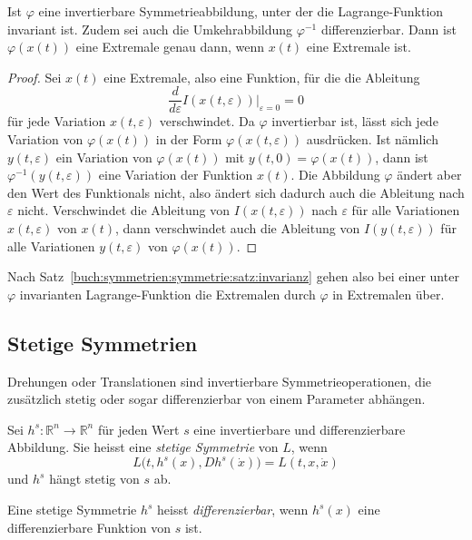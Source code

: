 \begin{satz}
\label{buch:symmetrien:symmetrie:satz:invarianz}
Ist $\varphi$ eine invertierbare Symmetrieabbildung, unter der die
Lagrange-Funktion invariant ist.
Zudem sei auch die Umkehrabbildung $\varphi^{-1}$ differenzierbar.
Dann ist $\varphi(x(t))$ eine Extremale genau dann, wenn $x(t)$ eine
Extremale ist.
\end{satz}

\begin{proof}
Sei $x(t)$ eine Extremale, also eine Funktion, für die die Ableitung
\[
\frac{d}{d\varepsilon}I(x(t,\varepsilon))
\bigg|_{\varepsilon=0}
=
0
\]
für jede Variation $x(t,\varepsilon)$ verschwindet.
Da $\varphi$ invertierbar ist, lässt sich jede Variation von
$\varphi(x(t))$ in der Form $\varphi(x(t,\varepsilon))$ ausdrücken.
Ist nämlich $y(t,\varepsilon)$ ein Variation von $\varphi(x(t))$
mit $y(t,0) = \varphi(x(t))$, dann ist $\varphi^{-1}(y(t,\varepsilon))$
eine Variation der Funktion $x(t)$.
Die Abbildung $\varphi$ ändert aber den Wert des Funktionals nicht,
also ändert sich dadurch auch die Ableitung nach $\varepsilon$ nicht.
Verschwindet die Ableitung von $I(x(t,\varepsilon))$ nach $\varepsilon$
für alle Variationen $x(t,\varepsilon)$ von $x(t)$, dann verschwindet
auch die Ableitung von $I(y(t,\varepsilon))$ für alle Variationen
$y(t,\varepsilon)$ von $\varphi(x(t))$.
\end{proof}

Nach Satz~\ref{buch:symmetrien:symmetrie:satz:invarianz} gehen 
also bei einer unter $\varphi$ invarianten Lagrange-Funktion die
Extremalen durch $\varphi$ in Extremalen über.

%
%
\subsection{Stetige Symmetrien}
Drehungen oder Translationen sind invertierbare Symmetrieoperationen,
die zusätzlich stetig oder sogar differenzierbar von einem Parameter
abhängen.

\begin{definition}
Sei $h^s\colon \mathbb{R}^n\to\mathbb{R}^n$ für jeden Wert $s$
eine invertierbare und differenzierbare Abbildung.
Sie heisst eine {\em stetige Symmetrie} von $L$, wenn
\[
L\bigl(t, h^s(x), Dh^s(\dot{x})\bigr)
=
L(t,x,\dot{x})
\]
und $h^s$ hängt stetig von $s$ ab.
\end{definition}

\begin{definition}
Eine stetige Symmetrie 
$h^s$ heisst {\em differenzierbar}, wenn $h^s(x)$
eine differenzierbare Funktion von $s$ ist.
\end{definition}

